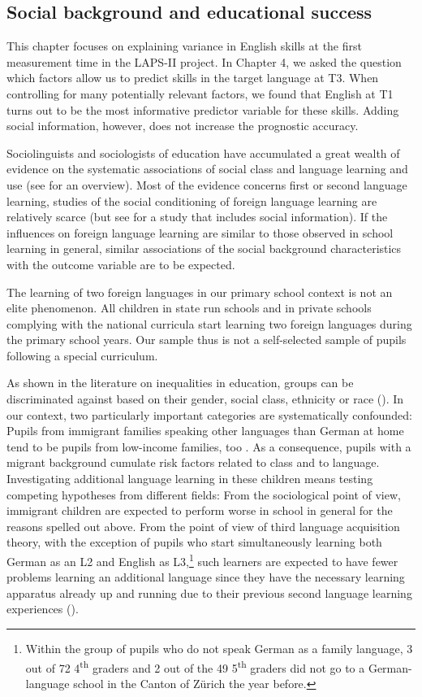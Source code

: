 \documentclass[output=paper]{langsci/langscibook}
\begin{document}
\subsection{Social background and educational success}\largerpage

This chapter focuses on explaining variance in English skills at the first measurement time in the LAPS-II project. In Chapter 4, we asked the question which factors allow us to predict skills in the target language at T3. When controlling for many potentially relevant factors, we found that English at T1 turns out to be the most informative predictor variable for these skills. Adding social information, however, does not increase the prognostic accuracy.

Sociolinguists and sociologists of education have accumulated a great wealth of evidence on the systematic associations of social class and language learning and use (see \citealt{AvineriJohnson2015} for an overview). Most of the evidence concerns first or second language learning, studies of the social conditioning of foreign language learning are relatively scarce (but see \citealt{Klieme2008} for a study that includes social information). If the influences on foreign language learning are similar to those observed in school learning in general, similar associations of the social background characteristics with the outcome variable are to be expected. 

The learning of two foreign languages in our primary school context is not an elite phenomenon. All children in state run schools and in private schools complying with the national curricula start learning two foreign languages during the primary school years. Our sample thus is not a self-selected sample of pupils following a special curriculum. 

As shown in the literature on inequalities in education, groups can be discriminated against based on their gender, social class, ethnicity or race (\citealt{LucasIrwin2018}). In our context, two particularly important categories are systematically confounded: Pupils from immigrant families speaking other languages than German at home tend to be pupils from low-income families, too \citep{Kronig2003}. As a consequence, pupils with a migrant background cumulate risk factors related to class and to language. Investigating additional language learning in these children means testing competing hypotheses from different fields: From the sociological point of view, immigrant children are expected to perform worse in school in general for the reasons spelled out above. From the point of view of third language acquisition theory, with the exception of pupils who start simultaneously learning both German as an L2 and English as L3,\footnote{Within the group of pupils who do not speak German as a family language, 3 out of 72 4\textsuperscript{th} graders and 2 out of the 49 5\textsuperscript{th} graders did not go to a German-language school in the Canton of Zürich the year before.} such learners are expected to have fewer problems learning an additional language since they have the necessary learning apparatus already up and running due to their previous second language learning experiences (\citealt{HerdinaJessner2002}).
\end{document}
